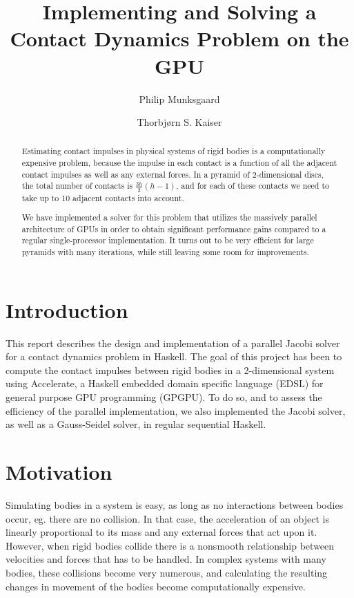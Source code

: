 \documentclass[runningheads,a4paper]{llncs}
\title{Implementing and Solving a Contact Dynamics Problem on the GPU}
\author{Philip Munksgaard \and Thorbjørn S. Kaiser}
\institute{
    University of Copenhagen Department of Computer Science (DIKU), \\
    Nørre Campus, Universitetsparken 5, DK-2100 Copenhagen Ø, Denmark
}
\begin{document}
\mainmatter
\maketitle

\begin{abstract}
Estimating contact impulses in physical systems of rigid bodies is a
computationally expensive problem, because the impulse in each contact is a
function of all the adjacent contact impulses as well as any external
forces. In a pyramid of 2-dimensional discs, the total number of contacts is
$\frac{3h}{2} (h-1)$, and for each of these contacts we need to take up to 10
adjacent contacts into account.

We have implemented a solver for this problem that utilizes the massively
parallel architecture of GPUs in order to obtain significant performance gains
compared to a regular single-processor implementation. It turns out to be very
efficient for large pyramids with many iterations, while still leaving some
room for improvements.

\end{abstract}

\section{Introduction}

This report describes the design and implementation of a parallel Jacobi solver
for a contact dynamics problem in Haskell. The goal of this project has been to
compute the contact impulses between rigid bodies in a 2-dimensional system
using Accelerate, a Haskell embedded domain specific language (EDSL) for general
purpose GPU programming (GPGPU). To do so, and to assess the efficiency of the
parallel implementation, we also implemented the Jacobi solver, as well as a
Gauss-Seidel solver, in regular sequential Haskell.


\section{Motivation}

Simulating bodies in a system is easy, as long as no interactions between
bodies occur, eg. there are no collision. In that case, the acceleration of an
object is linearly proportional to its mass and any external forces that act
upon it. However, when rigid bodies collide there is a nonsmooth relationship
between velocities and forces that has to be handled. In complex systems with
many bodies, these collisions become very numerous, and calculating the
resulting changes in movement of the bodies become computationally expensive.
\end{document}
